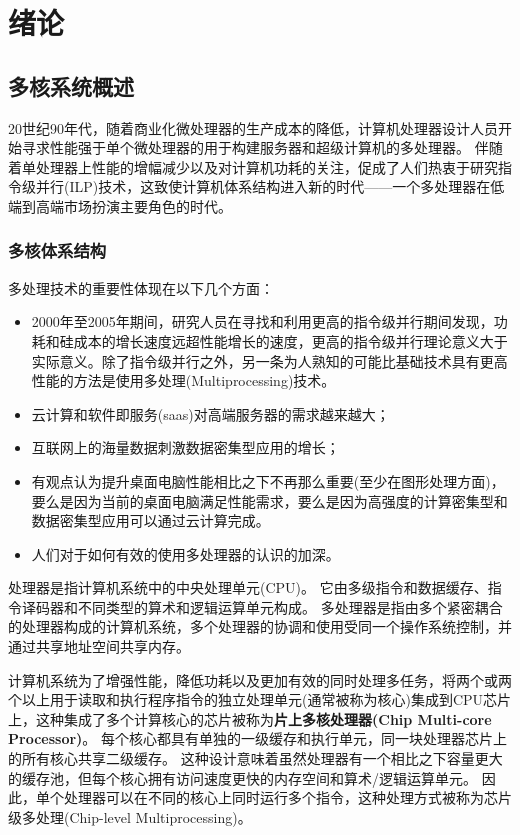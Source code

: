 \chapter{绪\quad 论}

\section{多核系统概述}
20世纪90年代，随着商业化微处理器的生产成本的降低，计算机处理器设计人员开始寻求性能强于单个微处理器的用于构建服务器和超级计算机的多处理器。
伴随着单处理器上性能的增幅减少以及对计算机功耗的关注，促成了人们热衷于研究指令级并行(ILP)技术，这致使计算机体系结构进入新的时代——一个多处理器在低端到高端市场扮演主要角色的时代。

\subsection{多核体系结构}
多处理技术的重要性体现在以下几个方面：
\begin{itemize}
	\item 2000年至2005年期间，研究人员在寻找和利用更高的指令级并行期间发现，功耗和硅成本的增长速度远超性能增长的速度，更高的指令级并行理论意义大于实际意义。除了指令级并行之外，另一条为人熟知的可能比基础技术具有更高性能的方法是使用多处理(Multiprocessing)技术。
	\item 云计算和软件即服务(saas)对高端服务器的需求越来越大；
	\item 互联网上的海量数据刺激数据密集型应用的增长；
	\item 有观点认为提升桌面电脑性能相比之下不再那么重要(至少在图形处理方面)，要么是因为当前的桌面电脑满足性能需求，要么是因为高强度的计算密集型和数据密集型应用可以通过云计算完成。
	\item 人们对于如何有效的使用多处理器的认识的加深。
\end{itemize}

处理器是指计算机系统中的中央处理单元(CPU)。
它由多级指令和数据缓存、指令译码器和不同类型的算术和逻辑运算单元构成。
多处理器是指由多个紧密耦合的处理器构成的计算机系统，多个处理器的协调和使用受同一个操作系统控制，并通过共享地址空间共享内存\cite{hennessy2011computer}。

计算机系统为了增强性能，降低功耗以及更加有效的同时处理多任务，将两个或两个以上用于读取和执行程序指令的独立处理单元(通常被称为核心)集成到CPU芯片上，这种集成了多个计算核心的芯片被称为\textbf{片上多核处理器(Chip Multi-core Processor)}\cite{geer2005chip}。
每个核心都具有单独的一级缓存和执行单元，同一块处理器芯片上的所有核心共享二级缓存。
这种设计意味着虽然处理器有一个相比之下容量更大的缓存池，但每个核心拥有访问速度更快的内存空间和算术/逻辑运算单元。
因此，单个处理器可以在不同的核心上同时运行多个指令，这种处理方式被称为芯片级多处理(Chip-level Multiprocessing)。

